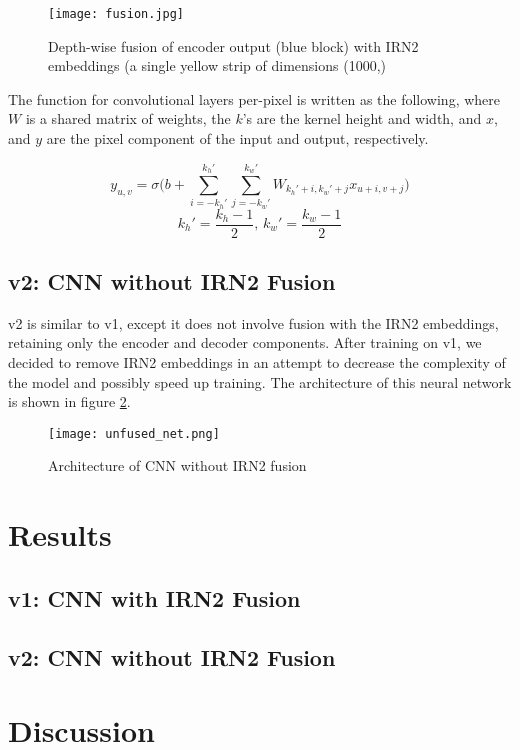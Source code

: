\documentclass{article} %
\begin{document}
\begin{figure}[h]
    \centering
        \texttt{[image: fusion.jpg]}
    \caption{Depth-wise fusion of encoder output (blue block) with IRN2 embeddings (a single yellow strip of dimensions (1000,)}
    \label{fig:fusion}
\end{figure}

The function for convolutional layers per-pixel is written as the following, where $W$ is a shared matrix of weights, the $k$'s are the kernel height and width, and $x$, and $y$ are the pixel component of the input and output, respectively.

$$y_{u, v} = \sigma \Big(b + \sum_{i = -k_h'}^{k_h'} \sum_{j = -k_w'}^{k_w'} W_{k_h' + i, k_w' + j} x_{u + i, v + j} \Big)$$
$$k_h' = \frac{k_h-1}{2} \mbox{, } k_w' = \frac{k_w-1}{2}$$

\subsection{v2: CNN without IRN2 Fusion}

v2 is similar to v1, except it does not involve fusion with the IRN2 embeddings, retaining only the encoder and decoder components. After training on v1, we decided to remove IRN2 embeddings in an attempt to decrease the complexity of the model and possibly speed up training. The architecture of this neural network is shown in figure \ref{fig:unfused_net}.

\begin{figure}[h]
    \centering
        \texttt{[image: unfused\_net.png]}
    \caption{Architecture of CNN without IRN2 fusion}
    \label{fig:unfused_net}
\end{figure}

\section{Results}

\subsection{v1: CNN with IRN2 Fusion}

\subsection{v2: CNN without IRN2 Fusion}

\section{Discussion}
\end{document}
